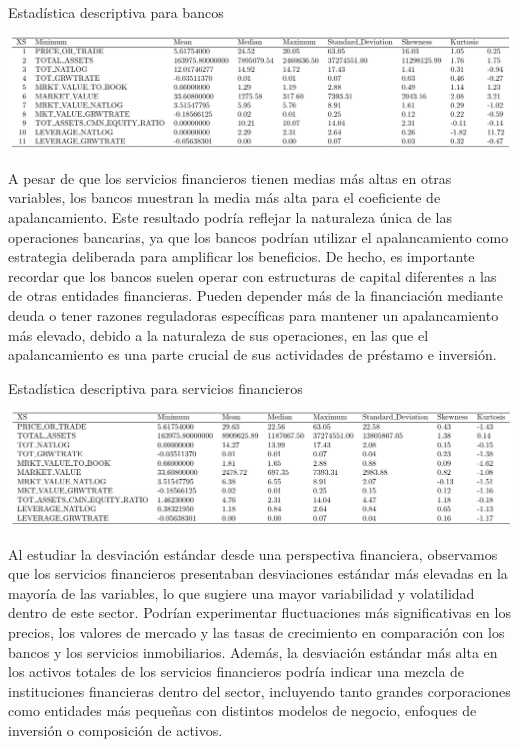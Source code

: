 \documentclass[a4paper,fleqn]{cas-sc}
\begin{document}
\begin{table}[h]
    \centering
    \caption{Estadística descriptiva para bancos}
    \includegraphics[width=1\textwidth]{tabla2.png}
\end{table}

A pesar de que los servicios financieros tienen medias más altas en otras variables, los bancos muestran la media más alta para el coeficiente de apalancamiento. Este resultado podría reflejar la naturaleza única de las operaciones bancarias, ya que los bancos podrían utilizar el apalancamiento como estrategia deliberada para amplificar los beneficios. De hecho, es importante recordar que los bancos suelen operar con estructuras de capital diferentes a las de otras entidades financieras. Pueden depender más de la financiación mediante deuda o tener razones reguladoras específicas para mantener un apalancamiento más elevado, debido a la naturaleza de sus operaciones, en las que el apalancamiento es una parte crucial de sus actividades de préstamo e inversión.

\begin{table}[h]
    \centering
    \caption{Estadística descriptiva para servicios financieros}
    \includegraphics[width=1\textwidth]{tabla3.png}
\end{table}

Al estudiar la desviación estándar desde una perspectiva financiera, observamos que los servicios financieros presentaban desviaciones estándar más elevadas en la mayoría de las variables, lo que sugiere una mayor variabilidad y volatilidad dentro de este sector. Podrían experimentar fluctuaciones más significativas en los precios, los valores de mercado y las tasas de crecimiento en comparación con los bancos y los servicios inmobiliarios. Además, la desviación estándar más alta en los activos totales de los servicios financieros podría indicar una mezcla de instituciones financieras dentro del sector, incluyendo tanto grandes corporaciones como entidades más pequeñas con distintos modelos de negocio, enfoques de inversión o composición de activos.
\end{document}
